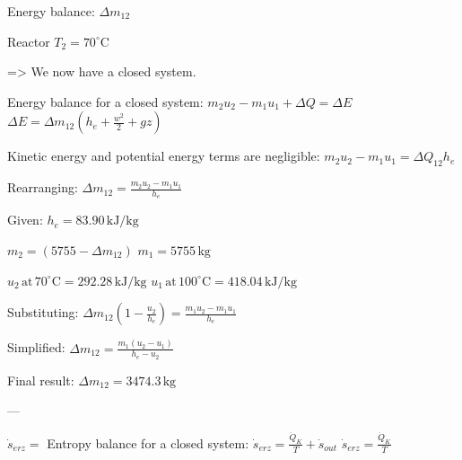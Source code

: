 Energy balance: \( \Delta m_{12} \)  

Reactor \( T_2 = 70^\circ \text{C} \)  

=> We now have a closed system.  

Energy balance for a closed system:  
\( m_2 u_2 - m_1 u_1 + \Delta Q = \Delta E \)  
\( \Delta E = \Delta m_{12} (h_e + \frac{w^2}{2} + g z) \)  

Kinetic energy and potential energy terms are negligible:  
\( m_2 u_2 - m_1 u_1 = \Delta Q_{12} h_e \)  

Rearranging:  
\( \Delta m_{12} = \frac{m_2 u_2 - m_1 u_1}{h_e} \)  

Given:  
\( h_e = 83.90 \, \text{kJ/kg} \)  

\( m_2 = (5755 - \Delta m_{12}) \)  
\( m_1 = 5755 \, \text{kg} \)  

\( u_2 \, \text{at} \, 70^\circ \text{C} = 292.28 \, \text{kJ/kg} \)  
\( u_1 \, \text{at} \, 100^\circ \text{C} = 418.04 \, \text{kJ/kg} \)  

Substituting:  
\( \Delta m_{12} (1 - \frac{u_2}{h_e}) = \frac{m_1 u_2 - m_1 u_1}{h_e} \)  

Simplified:  
\( \Delta m_{12} = \frac{m_1 (u_2 - u_1)}{h_e - u_2} \)  

Final result:  
\( \Delta m_{12} = 3474.3 \, \text{kg} \)  

---

\( \dot{s}_{erz} = \) Entropy balance for a closed system:  
\( \dot{s}_{erz} = \frac{\dot{Q}_K}{T} + \dot{s}_{out} \)  
\( \dot{s}_{erz} = \frac{\dot{Q}_K}{T} \)